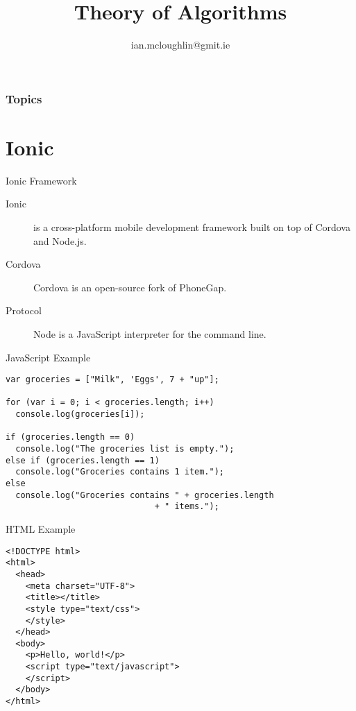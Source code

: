 
\title{Theory of Algorithms}
\subtitle{}
\author{ian.mcloughlin@gmit.ie}
\date{}


\begin{frame}
	\titlepage
\end{frame}

\begin{frame}
	\frametitle{Topics}
	\tableofcontents
\end{frame}

\section{Ionic}

\begin{frame}{Ionic Framework}
  \begin{description}
		\item[Ionic] is a cross-platform mobile development framework built on top of Cordova and Node.js.
    \vspace{0.25cm}
		\item[Cordova] Cordova is an open-source fork of PhoneGap.
    \vspace{0.25cm}
		\item[Protocol] Node is a JavaScript interpreter for the command line.
  \end{description}
\end{frame}


\begin{frame}[fragile]{JavaScript Example}
  \begin{verbatim}
var groceries = ["Milk", 'Eggs', 7 + "up"];

for (var i = 0; i < groceries.length; i++)
  console.log(groceries[i]);

if (groceries.length == 0)
  console.log("The groceries list is empty.");
else if (groceries.length == 1)
  console.log("Groceries contains 1 item.");
else
  console.log("Groceries contains " + groceries.length
                              + " items.");
  \end{verbatim}
\end{frame}


\begin{frame}[fragile]{HTML Example}
  \begin{verbatim}
<!DOCTYPE html>
<html>
  <head>
    <meta charset="UTF-8">
    <title></title>
    <style type="text/css">
    </style>
  </head>
  <body>
    <p>Hello, world!</p>
    <script type="text/javascript">
    </script>
  </body>
</html>
  \end{verbatim}
\end{frame}


